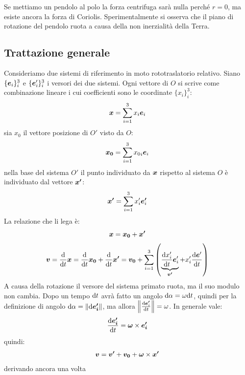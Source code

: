 \begin{Es}
Se mettiamo un pendolo al polo la forza centrifuga sarà nulla perché $r=0$, ma esiste ancora la forza di Coriolis. Sperimentalmente si osserva che il piano di rotazione del pendolo ruota a causa della non inerzialità della Terra.
\end{Es}
\subsection{Trattazione generale}
Consideriamo due sistemi di riferimento in moto rototraslatorio relativo. Siano $\{\boldsymbol{e}_i\}_i^3$ e $\{\boldsymbol{e}'_i\}_i^3$ i versori dei due sistemi. Ogni vettore di $O$ si scrive come combinazione lineare i cui coefficienti sono le coordinate $\{x_i\}_i^3$:
\begin{equation*}
 \boldsymbol{x}=\sum_{i=1}^3 x_i\boldsymbol{e}_i
\end{equation*}
sia $x_0$ il vettore posizione di $O'$ visto da $O$:
\begin{equation*}
 \boldsymbol{x_0}=\sum_{i=1}^3 {x_0}_i \boldsymbol{e}_i
\end{equation*}
nella base del sistema $O'$ il punto individuato da $\boldsymbol{x}$ rispetto al sistema $O$ è individuato dal vettore $\boldsymbol{x'}$:
\begin{equation*}
 \boldsymbol{x'}=\sum_{i=1}^3 x'_i\boldsymbol{e'}_i
\end{equation*}
La relazione che li lega è:
\begin{equation*}
 \boldsymbol{x} =  \boldsymbol{x_0}+\boldsymbol{x'}
\end{equation*}
\begin{equation*}
 \boldsymbol{v}=\frac{\mathrm{d}}{\mathrm{d} t}\boldsymbol{x}=\frac{\mathrm{d}}{\mathrm{d} t}\boldsymbol{x_0}+\frac{\mathrm{d}}{\mathrm{d} t}\boldsymbol{x'}=\boldsymbol{v_0}+\sum_{i=1}^3\left(\underbrace{\frac{\mathrm{d} x'_i}{\mathrm{d} t}\boldsymbol{e}'_i}_{\boldsymbol{v'}}+x'_i\frac{\mathrm{d} \boldsymbol{e}'}{\mathrm{d} t}\right)
\end{equation*}
A causa della rotazione il versore del sistema primato ruota, ma il suo modulo non cambia. Dopo un tempo $\mathrm{d} t$ avrà fatto un angolo $\mathrm{d}\alpha=\omega\mathrm{d} t$, quindi per la definizione di angolo $\mathrm{d}\alpha=\left\lVert\mathrm{d}\boldsymbol{e'_i}\right\rVert$, ma allora $\left\lVert\frac{\mathrm{d} \boldsymbol{e'}_i}{\mathrm{d} t}\right\rVert = \omega$. In generale vale:
\begin{equation*}
 \frac{\mathrm{d}\boldsymbol{e'_i}}{\mathrm{d} t}=\boldsymbol{\omega}\times\boldsymbol{e'_i}
\end{equation*}
quindi:
\begin{equation*}
 \boldsymbol{v}=\boldsymbol{v'}+\boldsymbol{v_0}+\boldsymbol{\omega}\times\boldsymbol{x'}
\end{equation*}
derivando ancora una volta

